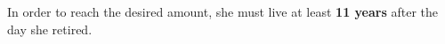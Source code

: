 \documentclass[a4paper,11pt,twoside]{article}
\begin{document}
In order to reach the desired amount, she must live at least \textbf{11 years} after the day she retired. 







\end{document}
